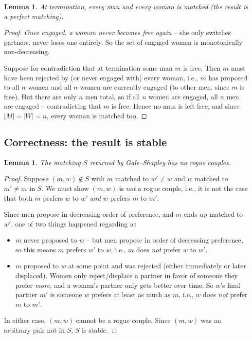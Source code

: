 \documentclass[11pt]{article}
\newtheorem{lemma}[theorem]{Lemma}
\begin{document}
\begin{lemma}
At termination, every man and every woman is matched (the result is a perfect matching).
\end{lemma}
\begin{proof}
\emph{Once engaged, a woman never becomes free again} -- she only switches partners, never
loses one entirely. So the set of engaged women is monotonically non-decreasing.

Suppose for contradiction that at termination some man $m$ is free. Then $m$ must have
been rejected by (or never engaged with) every woman, i.e., $m$ has proposed to all $n$
women and all $n$ women are currently engaged (to other men, since $m$ is free).
But there are only $n$ men total, so if all $n$ women are engaged, all $n$ men are engaged
-- contradicting that $m$ is free. Hence no man is left free, and since $|M| = |W| = n$,
every woman is matched too.
\end{proof}

\subsection{Correctness: the result is stable}

\begin{lemma}
The matching $S$ returned by Gale--Shapley has no rogue couples.
\end{lemma}
\begin{proof}
Suppose $(m, w) \notin S$ with $m$ matched to $w'\ne w$ and $w$ matched to $m' \ne m$ in
$S$. We must show $(m,w)$ is \emph{not} a rogue couple, i.e., it is not the case that both
$m$ prefers $w$ to $w'$ \emph{and} $w$ prefers $m$ to $m'$.

Since men propose in decreasing order of preference, and $m$ ends up matched to $w'$, one
of two things happened regarding $w$:
\begin{itemize}
    \item $m$ never proposed to $w$ -- but men propose in order of decreasing preference,
    so this means $m$ prefers $w'$ to $w$, i.e., $m$ does \emph{not} prefer $w$ to $w'$.
    \item $m$ proposed to $w$ at some point and was rejected (either immediately or later
    displaced). Women only reject/displace a partner in favor of someone they prefer
    \emph{more}, and a woman's partner only gets better over time. So $w$'s final partner
    $m'$ is someone $w$ prefers at least as much as $m$, i.e., $w$ does \emph{not} prefer
    $m$ to $m'$.
\end{itemize}
In either case, $(m,w)$ cannot be a rogue couple. Since $(m,w)$ was an arbitrary pair not
in $S$, $S$ is stable.
\end{proof}
\end{document}
